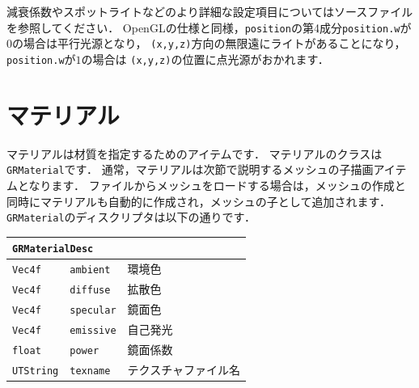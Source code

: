 \KLUDGE 減衰係数やスポットライトなどのより詳細な設定項目についてはソースファイルを参照してください．
OpenGL\KLUDGE の仕様と同様，\texttt{position}\KLUDGE の第4\KLUDGE 成分\texttt{position.w}\KLUDGE が$0$\KLUDGE の場合は平行光源となり，
\texttt{(x,y,z)}\KLUDGE 方向の無限遠にライトがあることになり，\texttt{position.w}\KLUDGE が$1$\KLUDGE の場合は
\texttt{(x,y,z)}\KLUDGE の位置に点光源がおかれます．

\section{\KLUDGE マテリアル}
\label{sec_grmaterial}

\KLUDGE マテリアルは材質を指定するためのアイテムです．
\KLUDGE マテリアルのクラスは\texttt{GRMaterial}\KLUDGE です．
\KLUDGE 通常，マテリアルは次節で説明するメッシュの子描画アイテムとなります．
\KLUDGE ファイルからメッシュをロードする場合は，メッシュの作成と同時にマテリアルも自動的に作成され，メッシュの子として追加されます．
\texttt{GRMaterial}\KLUDGE のディスクリプタは以下の通りです．

\begin{center}
\begin{tabular}{p{.15\hsize}p{.45\hsize}p{.3\hsize}}
\multicolumn{3}{l}{\texttt{GRMaterialDesc}}				\\ \midrule
\texttt{Vec4f}		&	\texttt{ambient}	& \KLUDGE 環境色 	\\
\texttt{Vec4f}		&	\texttt{diffuse}	& \KLUDGE 拡散色 	\\
\texttt{Vec4f}		&	\texttt{specular}	& \KLUDGE 鏡面色	\\
\texttt{Vec4f}		&	\texttt{emissive}	& \KLUDGE 自己発光	\\
\texttt{float}		&	\texttt{power}		& \KLUDGE 鏡面係数	\\
\texttt{UTString}	&	\texttt{texname}	& \KLUDGE テクスチャファイル名
\end{tabular}
\end{center}

